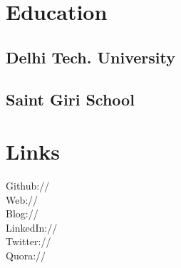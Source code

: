 \documentclass[]{deedy-resume-openfont}
\begin{document}
%
%
\lastupdated

%
%



%
%

\begin{minipage}[t]{0.33\textwidth} 


\section{Education} 

\subsection{Delhi Tech. University}
\sectionsep


\subsection{Saint Giri School}
\sectionsep


\section{Links} 
Github:// \href{https://github.com/aktech}{} \\
Web:// \href{http://iamit.in/}{} \\
Blog:// \href{http://iamit.in/blog/}{} \\
LinkedIn://  \href{https://www.linkedin.com/in/iaktech}{} \\
Twitter://  \href{https://twitter.com/iaktech}{} \\
Quora://  \href{https://www.quora.com/Amit-Kumar-516}{}
\sectionsep


\end{minipage}
\end{document}
